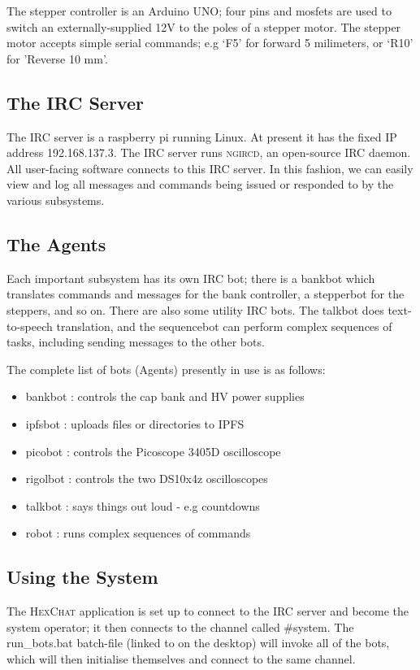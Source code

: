 The stepper controller is an Arduino UNO; four pins and mosfets are used to switch an externally-supplied 12V to the poles of a stepper motor. The stepper motor accepts simple serial commands; e.g `F5' for forward 5 milimeters, or `R10' for 'Reverse 10 mm'.

\subsection{The IRC Server}

The IRC server is a raspberry pi running Linux. At present it has the fixed IP address 192.168.137.3.
The IRC server runs \textsc{ngircd}, an open-source IRC daemon. All user-facing software connects
to this IRC server. In this fashion, we can easily view and log all messages and commands being issued
or responded to by the various subsystems.

\subsection{The Agents}

Each important subsystem has its own IRC bot; there is a bankbot which translates commands and messages for the bank controller, a stepperbot for the steppers, and so on. There are also some utility IRC bots. The talkbot does text-to-speech translation, and the sequencebot can perform complex sequences of tasks,
including sending messages to the other bots.

The complete list of bots (Agents) presently in use is as follows:

\begin{itemize}
 \item{bankbot  : controls the cap bank and HV power supplies }
 \item{ipfsbot  : uploads files or directories to IPFS }
 \item{picobot  : controls the Picoscope 3405D oscilloscope }
 \item{rigolbot : controls the two DS10x4z oscilloscopes }
 \item{talkbot  : says things out loud - e.g countdowns }
 \item{robot    : runs complex sequences of commands }
\end{itemize}

\subsection{Using the System}
The \textsc{HexChat} application is set up to connect to the IRC server and become the system operator;
it then connects to the channel called \#system. The run\_bots.bat batch-file (linked to on the desktop) will
invoke all of the bots, which will then initialise themselves and connect to the same channel.

